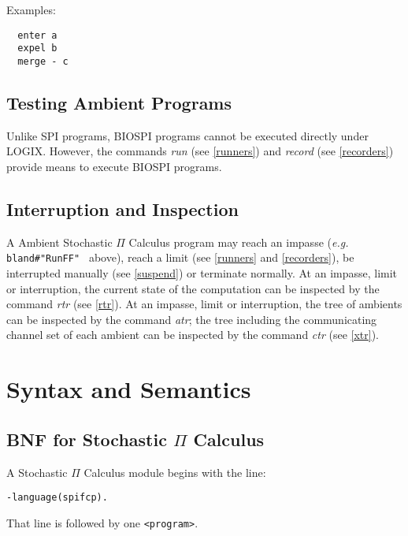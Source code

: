 \noindent
Examples:

\begin{verbatim}
  enter a
  expel b
  merge - c
\end{verbatim}

\section{Testing Ambient Programs}

Unlike SPI programs, BIOSPI programs cannot be
executed directly under LOGIX.  However, the commands {\em run} (see
\ref{runners}) and {\em record} (see \ref{recorders})
provide means to execute BIOSPI programs.

\section{Interruption and Inspection}

A Ambient Stochastic $\Pi$ Calculus program may reach an impasse ({\em e.g.}
\verb+ bland#"RunFF" + above), reach a limit (see \ref{runners}
and \ref{recorders}), be interrupted manually (see \ref{suspend})
or terminate normally.  At an impasse, limit or interruption,
the current state of the computation can be inspected by the command
{\em rtr} (see \ref{rtr}).
At an impasse, limit or interruption, the tree of ambients can be inspected
by the command {\em atr}; the tree including the communicating channel
set of each ambient can be inspected by the command {\em ctr}
(see \ref{xtr}).

\appendix
\chapter{Syntax and Semantics}
\section{BNF for Stochastic $\Pi$ Calculus}
\label{SPIBNF}
A Stochastic $\Pi$ Calculus module begins with the line:

\begin{verbatim}
-language(spifcp).
\end{verbatim}

\noindent
That line is followed by one \verb+<program>+.

